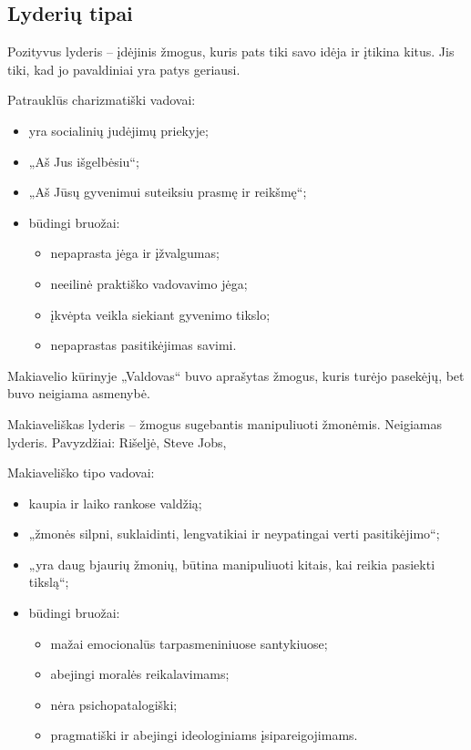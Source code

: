 \subsection{Lyderių tipai}

Pozityvus lyderis – įdėjinis žmogus, kuris pats tiki savo idėja ir įtikina
kitus. Jis tiki, kad jo pavaldiniai yra patys geriausi.

Patrauklūs charizmatiški vadovai:
\begin{itemize}
  \item yra socialinių judėjimų priekyje;
  \item „Aš Jus išgelbėsiu“;
  \item „Aš Jūsų gyvenimui suteiksiu prasmę ir reikšmę“;
  \item būdingi bruožai:
    \begin{itemize}
      \item nepaprasta jėga ir įžvalgumas;
      \item neeilinė praktiško vadovavimo jėga;
      \item įkvėpta veikla siekiant gyvenimo tikslo;
      \item nepaprastas pasitikėjimas savimi.
    \end{itemize}
\end{itemize}

Makiavelio kūrinyje „Valdovas“ buvo aprašytas žmogus, kuris turėjo
pasekėjų, bet buvo neigiama asmenybė.

Makiaveliškas lyderis – žmogus sugebantis manipuliuoti žmonėmis.
Neigiamas lyderis. Pavyzdžiai: Rišeljė, Steve Jobs, 

Makiaveliško tipo vadovai:
\begin{itemize}
  \item kaupia ir laiko rankose valdžią;
  \item „žmonės silpni, suklaidinti, lengvatikiai ir neypatingai verti
    pasitikėjimo“;
  \item „yra daug bjaurių žmonių, būtina manipuliuoti kitais, kai reikia
    pasiekti tikslą“;
  \item būdingi bruožai:
    \begin{itemize}
      \item mažai emocionalūs tarpasmeniniuose santykiuose;
      \item abejingi moralės reikalavimams;
      \item nėra psichopatalogiški;
      \item pragmatiški ir abejingi ideologiniams įsipareigojimams.
    \end{itemize}
\end{itemize}

